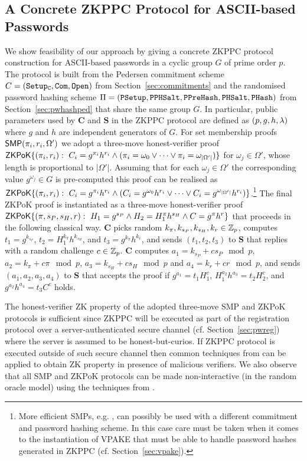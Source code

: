 \subsection{A Concrete ZKPPC Protocol for ASCII-based Passwords}\label{sec:instantiation}
We show feasibility of our approach by giving a concrete ZKPPC protocol construction for ASCII-based passwords in a cyclic group $G$ of prime order $p$. 
The protocol is built from the Pedersen commitment scheme $C=(\mathtt{Setup_C},\mathtt{Com},\mathtt{Open})$ from Section~\ref{sec:commitments} and the randomised password hashing scheme $\Pi=(\mathtt{PSetup},\allowbreak\mathtt{PPHSalt},\allowbreak\mathtt{PPreHash},\mathtt{PHSalt},\allowbreak\mathtt{PHash})$ from Section~\ref{sec:pwhashped} that share the same group $G$. 
In particular, public parameters used by $\bm{C}$ and $\bm{S}$ in the ZKPPC protocol are defined as $(p,g,h,\lambda)$ where $g$ and $h$ are independent generators of $G$. 
For set membership proofs $\mathsf{SMP}(\pi_i,r_i,\Omega')$ we adopt a three-move honest-verifier proof $\mathsf{ZKPoK}\{(\pi_i,r_i):~ C_i=g^{\pi_i}h^{r_i} \wedge (\pi_i=\omega_0 \vee \dots \vee \pi_i=\omega_{|\Omega'|})\}$ for $\omega_j\in\Omega'$, whose length is proportional to $|\Omega'|$. 
Assuming that for each $\omega_j\in\Omega'$ the corresponding value $g^{\omega_j}\in G$ is pre-computed this proof can be realised as $\mathsf{ZKPoK}\{(\pi_i,r_i):~ C_i=g^{\pi_i}h^{r_i} \wedge (C_i=g^{\omega_0}h^{r_i} \vee \dots \vee C_i=g^{\omega_{|\Omega'|}}h^{r_i})\}$.\footnote{More efficient SMPs, e.g. \cite{CamenischCS08}, can possibly be used with a different commitment and password hashing scheme. 
In this case care must be taken when it comes to the instantiation of VPAKE that must be able to handle password hashes generated in ZKPPC (cf. Section~\ref{sec:vpake}).}
The final ZKPoK proof is instantiated as a three-move honest-verifier proof $\mathsf{ZKPoK}\{(\pi, s_P, s_H, r):~ H_1=g^{s_P} \wedge H_2 = H_1^{\pi}h^{s_H} \wedge C = g^\pi h^{r}\}$ that proceeds in the following classical way. 
$\bm{C}$ picks random $k_\pi, k_{s_P}, k_{s_H}, k_{r}\in\mathbb{Z}_p$, computes $t_1=g^{k_{s_P}}$, $t_2=H_1^{k_\pi}h^{k_{s_H}}$, and $t_3=g^{k_\pi}h^{k_{r}}$, and sends $(t_1,t_2,t_3)$ to $\bm{S}$ that replies with a random challenge $c\in\mathbb{Z}_p$. $\bm{C}$ computes $a_1=k_{s_P}+cs_P\mod p$, $a_2=k_\pi+c\pi \mod p$, $a_3=k_{s_H}+cs_{H}\mod p$ and $a_4=k_{r}+cr\mod p$, and sends $(a_1,a_2,a_3,a_4)$ to $\bm{S}$ that accepts the proof if $g^{a_1}=t_1 H_1^{c}$, $H_1^{a_2}h^{a_3}=t_2H_2^c$, and $g^{a_2}h^{a_4}=t_3C^c$ holds.

\begin{remark}
The honest-verifier ZK property of the adopted three-move SMP and ZKPoK protocols is sufficient since ZKPPC will be executed as part of the registration protocol over a server-authenticated secure channel (cf. Section~\ref{sec:pwreg}) where the server is assumed to be honest-but-curios. 
If ZKPPC protocol is executed outside of such secure channel then common techniques from \cite{CramerDM00} can be applied to obtain ZK property in presence of malicious verifiers. 
We also observe that all SMP and ZKPoK protocols can be made non-interactive (in the random oracle model) using the techniques from \cite{FiatS86}.
\end{remark}


